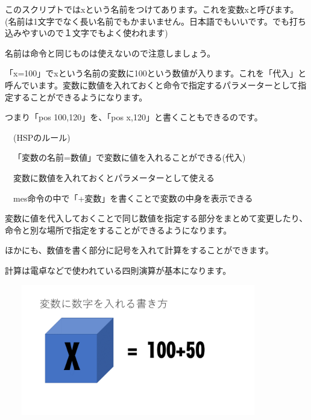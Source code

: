 \documentclass[a4paper,12pt]{jarticle}
\begin{document}
\bigskip
\bigskip
\bigskip

このスクリプトではxという名前をつけてあります。これを変数xと呼びます。(名前は1文字でなく長い名前でもかまいません。日本語でもいいです。でも打ち込みやすいので１文字でもよく使われます)

名前は命令と同じものは使えないので注意しましょう。


\bigskip

「x=100」でxという名前の変数に100という数値が入ります。これを「代入」と呼んでいます。変数に数値を入れておくと命令で指定するパラメーターとして指定することができるようになります。

つまり「pos 100,120」を、「pos x,120」と書くこともできるのです。


\bigskip

\ \ (HSPのルール)


\bigskip

\ \ 「変数の名前=数値」で変数に値を入れることができる(代入)

\ \ 変数に数値を入れておくとパラメーターとして使える

\ \ mes命令の中で「+変数」を書くことで変数の中身を表示できる

\bigskip

変数に値を代入しておくことで同じ数値を指定する部分をまとめて変更したり、命令と別な場所で指定をすることができるようになります。

\bigskip

ほかにも、数値を書く部分に記号を入れて計算をすることができます。

計算は電卓などで使われている四則演算が基本になります。

\bigskip
\bigskip

\begin{minipage}{9.781cm}
\centering
{\upshape
\includegraphics[keepaspectratio,width=11.695cm,height=5.741cm]{text02-img/text02-img046.png}}
\end{minipage}

\bigskip
\bigskip
\bigskip
\end{document}
